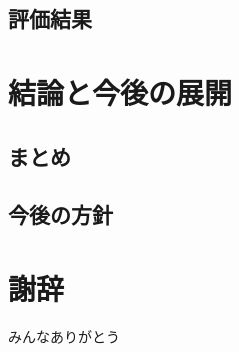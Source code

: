 \documentclass{funthesis}
\begin{document}
\section{評価結果}



\chapter{結論と今後の展開}

\section{まとめ}


\section{今後の方針}


\chapter*{謝辞}

みんなありがとう
\end{document}

